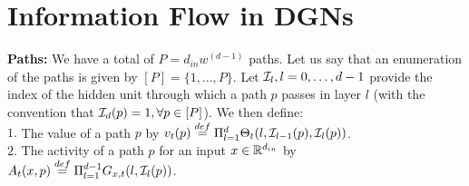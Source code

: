 \section{Information Flow in DGNs}\label{sec:expressivity}
\textbf{Paths:} We have a total of $P=d_{in}w^{(d-1)}$ paths. Let us say that an enumeration of the paths is given by $[P]=\{1,\ldots,P\}$. Let $\mathcal{I}_{l},l=0,\ldots,d-1$ provide the index of the hidden unit through which a path $p$ passes in layer $l$ (with the convention that $\mathcal{I}_d(p)=1,\forall p\in [P]$). We then define:\\
$1.$ The value of a path $p$ by $v_t(p)\stackrel{def}=\Pi_{l=1}^d \Theta_t(l,\mathcal{I}_{l-1}(p),\mathcal{I}_l(p))$.\\
$2.$ The activity of a path $p$ for an input $x\in \mathbb{R}^{d_{in}}$ by $A_{t}(x,p)\stackrel{def}{=}\Pi_{l=1}^{d-1} G_{x,t}(l,\mathcal{I}_l(p))$.
\FloatBarrier
\begin{table}[h]
\begin{minipage}{0.5\columnwidth}
\end{minipage}
\begin{minipage}{0.5\columnwidth}
\end{minipage}
\caption{Shows all zeroth-order and first-order quantities related to information flow in a DGN.}
\label{tb:terms}
\end{table}
